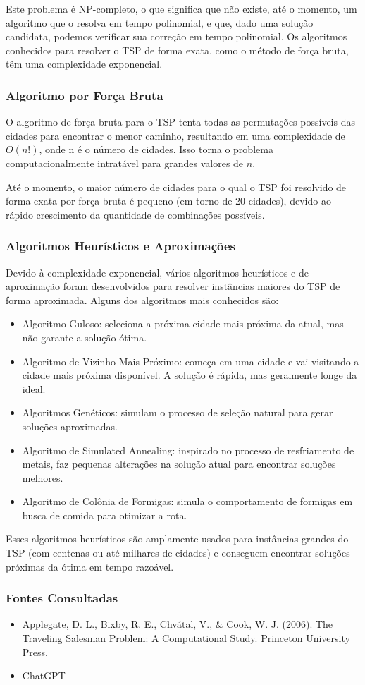 \documentclass{article}
\begin{document}
Este problema é NP-completo, o que significa que não existe, até o momento, um 
algoritmo que o resolva em tempo polinomial, e que, dado uma solução candidata, 
podemos verificar sua correção em tempo polinomial. Os algoritmos conhecidos 
para resolver o TSP de forma exata, como o método de força bruta, têm uma 
complexidade exponencial.

\subsubsection{Algoritmo por Força Bruta}
O algoritmo de força bruta para o TSP tenta todas as permutações possíveis das 
cidades para encontrar o menor caminho, resultando em uma complexidade de $O(n!)$, 
onde n é o número de cidades. Isso torna o problema computacionalmente 
intratável para grandes valores de $n$.

Até o momento, o maior número de cidades para o qual o TSP foi resolvido de 
forma exata por força bruta é pequeno (em torno de 20 cidades), devido ao rápido 
crescimento da quantidade de combinações possíveis.

\subsubsection{Algoritmos Heurísticos e Aproximações}
Devido à complexidade exponencial, vários algoritmos heurísticos e de 
aproximação foram desenvolvidos para resolver instâncias maiores do TSP de forma 
aproximada. Alguns dos algoritmos mais conhecidos são:
\begin{itemize}
    \item Algoritmo Guloso: seleciona a próxima cidade mais próxima da atual, 
    mas não garante a solução ótima.
    \item Algoritmo de Vizinho Mais Próximo: começa em uma cidade e vai visitando 
    a cidade mais próxima disponível. A solução é rápida, mas geralmente longe da 
    ideal.
    \item Algoritmos Genéticos: simulam o processo de seleção natural para gerar 
    soluções aproximadas.
    \item Algoritmo de Simulated Annealing: inspirado no processo de resfriamento 
    de metais, faz pequenas alterações na solução atual para encontrar soluções 
    melhores.
    \item Algoritmo de Colônia de Formigas: simula o comportamento de formigas em 
    busca de comida para otimizar a rota.
\end{itemize}
Esses algoritmos heurísticos são amplamente usados para instâncias grandes do 
TSP (com centenas ou até milhares de cidades) e conseguem encontrar soluções 
próximas da ótima em tempo razoável.

\subsubsection{Fontes Consultadas}
\begin{itemize}
    \item Applegate, D. L., Bixby, R. E., Chvátal, V., \& Cook, W. J. (2006). The 
    Traveling Salesman Problem: A Computational Study. Princeton University Press.
    \item ChatGPT
\end{itemize}
\end{document}
